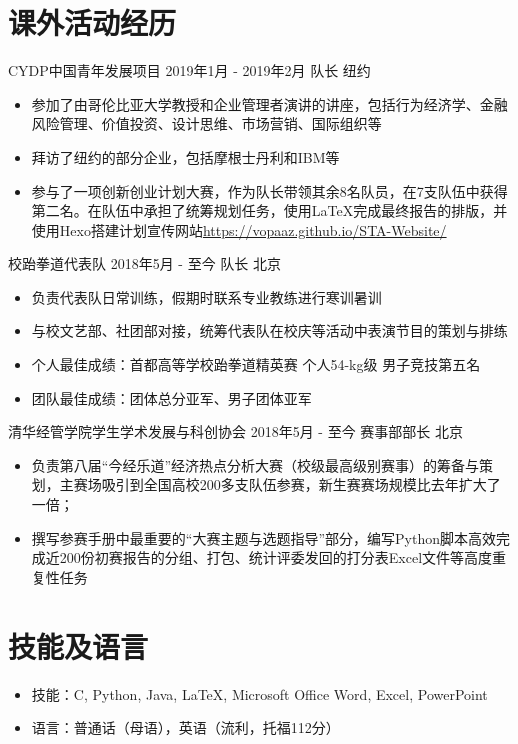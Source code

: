 \documentclass{resumeZH}
\begin{document}
    \section{课外活动经历}
    \Experience
    {CYDP中国青年发展项目}
    {2019年1月 - 2019年2月}
    {队长}
    {纽约}
    \begin{itemize}
        \item 参加了由哥伦比亚大学教授和企业管理者演讲的讲座，包括行为经济学、金融风险管理、价值投资、设计思维、市场营销、国际组织等
        \item 拜访了纽约的部分企业，包括摩根士丹利和IBM等
        \item 参与了一项创新创业计划大赛，作为队长带领其余8名队员，在7支队伍中获得第二名。在队伍中承担了统筹规划任务，使用\LaTeX 完成最终报告的排版，并使用Hexo搭建计划宣传网站\href{https://vopaaz.github.io/STA-Website/}{https://vopaaz.github.io/STA-Website/}
    \end{itemize}

    \Experience
    {校跆拳道代表队}
    {2018年5月 - 至今}
    {队长}
    {北京}

    \begin{itemize}
        \item 负责代表队日常训练，假期时联系专业教练进行寒训暑训
        \item 与校文艺部、社团部对接，统筹代表队在校庆等活动中表演节目的策划与排练
        \item 个人最佳成绩：首都高等学校跆拳道精英赛 个人54-kg级 男子竞技第五名
        \item 团队最佳成绩：团体总分亚军、男子团体亚军
    \end{itemize}

    \Experience
    {清华经管学院学生学术发展与科创协会}
    {2018年5月 - 至今}
    {赛事部部长}
    {北京}

    \begin{itemize}
        \item 负责第八届“今经乐道”经济热点分析大赛（校级最高级别赛事）的筹备与策划，主赛场吸引到全国高校200多支队伍参赛，新生赛赛场规模比去年扩大了一倍；
        \item 撰写参赛手册中最重要的“大赛主题与选题指导”部分，编写Python脚本高效完成近200份初赛报告的分组、打包、统计评委发回的打分表Excel文件等高度重复性任务
    \end{itemize}

    \section{技能及语言}
    \vspace{0.618ex}
    \begin{itemize}
        \item 技能：C, Python, Java, LaTeX, Microsoft Office Word, Excel, PowerPoint
        \item 语言：普通话（母语），英语（流利，托福112分）
    \end{itemize}
\end{document}
